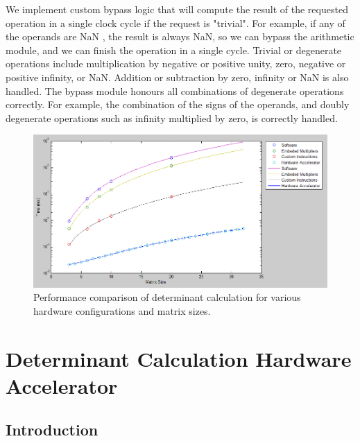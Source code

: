 \documentclass[]{article}
\begin{document}
We implement custom bypass logic that will compute the result of the requested operation in a single clock cycle if the request is "trivial". 
For example, if any of the operands are NaN \cite{ieee754}, the result is always NaN, so we can bypass the arithmetic module, and we can finish the operation in a single cycle.
Trivial or degenerate operations include multiplication by negative or positive unity, zero, negative or positive infinity, or NaN. Addition or subtraction by zero, infinity or NaN is also handled.
The bypass module honours all combinations of degenerate operations correctly. For example, the combination of the signs of the operands, and doubly degenerate operations such as infinity multiplied by zero, is correctly handled.

\begin{figure}[p]
	\begin{center}
		\includegraphics[width = \textwidth]{detcalcperf.PNG}
	\end{center}
	\caption{Performance comparison of determinant calculation for various hardware configurations and matrix sizes.}
	\label{fig:det_calc_perf}
\end{figure}



\clearpage

\section{Determinant Calculation Hardware Accelerator} %
\label{sec:determinant_calculation_hardware_accelerator}

\subsection{Introduction} %
\label{sub:introduction}
\end{document}
